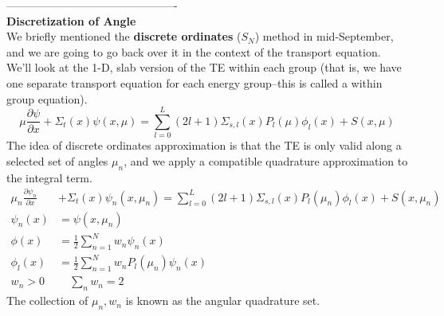 \documentclass[12pt]{article}
\begin{document}
\vspace*{1 em}
----------------------------------------------\\
\textbf{Discretization of Angle}\\
We briefly mentioned the \textbf{discrete ordinates} ($S_N$) method in mid-September, and we are going to go back over it in the context of the transport equation.\\
We'll look at the 1-D, slab version of the TE within each group (that is, we have one separate transport equation for each energy group--this is called a within group equation).
\[
\mu \frac{\partial \psi}{\partial x} + \Sigma_t(x)\psi(x,\mu) = \sum_{l=0}^L (2l+1) \Sigma_{s,l}(x) P_l(\mu)\phi_l(x) + S(x,\mu)
\]
The idea of discrete ordinates approximation is that the TE is only valid along a selected set of angles $\mu_n$, and we apply a compatible quadrature approximation to the integral term.
\begin{align*}
\mu_n \frac{\partial \psi_n}{\partial x} &+ \Sigma_t(x)\psi_n(x,\mu_n) = \sum_{l=0}^L (2l+1) \Sigma_{s,l}(x) P_l(\mu_n)\phi_l(x) + S(x,\mu_n)\\
\psi_n(x) &= \psi(x,\mu_n)\\
\phi(x) &=  \frac{1}{2}\sum_{n=1}^N w_n \psi_n(x)\\
\phi_l(x) &= \frac{1}{2}\sum_{n=1}^N w_n P_l(\mu_n)\psi_n(x)\\
w_n > 0& \quad \sum_n w_n = 2
\end{align*}
The collection of $\mu_n, w_n$ is known as the angular quadrature set.
\end{document}
